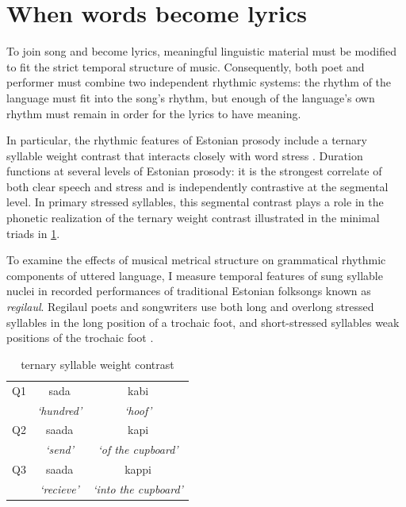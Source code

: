 \section{When words become lyrics}
To join song and become lyrics, meaningful linguistic material must be modified to fit the strict temporal structure of music. Consequently, both poet and performer must combine two independent rhythmic systems: the rhythm of the language must fit into the song's rhythm, but enough of the language's own rhythm must remain in order for the lyrics to have meaning. 


In particular, the rhythmic features of Estonian prosody include a ternary syllable weight contrast that interacts closely with word stress \citep{lehiste1960,lehiste1965,lehiste1978,eekMeister1998,asuPire2009}.  
Duration functions at several levels of Estonian prosody: it is the strongest correlate of both clear speech and stress \citep{lippusAsuMari2014} and is independently contrastive at the segmental level. In primary stressed syllables, this segmental contrast plays a role in the phonetic realization of the ternary weight contrast illustrated in the minimal triads in \ref{qexamps}.  

To examine the effects of musical metrical structure on grammatical rhythmic components of uttered language, I measure temporal features of sung syllable nuclei in recorded performances of traditional Estonian folksongs known as {\it regilaul}. Regilaul poets and songwriters use both long and overlong stressed syllables in the long position of a trochaic foot, and short-stressed syllables weak positions of the trochaic foot \citep{lotmanLotman2013}.  


%

 \begin{table}[htb]
\centering
\begin{tabular}{lcc}
\hline

Q1 &		 sada 		& 	kabi  \\  
	&	 {\it `hundred'} 	&	 {\it`hoof' }\\
\hline
Q2 &		saada 		&	kapi \\
	&	 {\it`send' }		&	{\it`of the cupboard' }		\\
\hline
Q3 &		saada 	&	 kappi 	\\
	&	{\it`recieve' }	&	{\it`into the cupboard' }	\\
\hline
\end{tabular}

\caption{ternary syllable weight contrast}
\label{qexamps}
\end{table}

